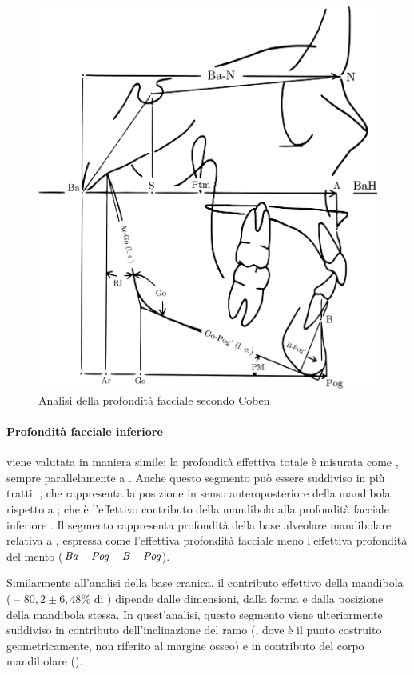 \begin{figure}[ht]
\centering
\includegraphics[width=.6\columnwidth]{./images/coben_profondita_facciale.pdf}
\caption{Analisi della profondità facciale secondo Coben}
\label{fig:coben_profondita_facciale}
\end{figure}

\paragraph{Profondità facciale inferiore} viene valutata in maniera simile: la profondità effettiva totale è misurata come , sempre parallelamente a . Anche questo segmento può essere suddiviso in più tratti: , che rappresenta la posizione in senso anteroposteriore della mandibola rispetto a ;  che è l'effettivo contributo della mandibola alla profondità facciale inferiore . Il segmento  rappresenta profondità della base alveolare mandibolare relativa a , espressa come l'effettiva profondità facciale meno l'effettiva profondità del mento ($\textit{Ba}-\textit{Pog} - \textit{B}-\textit{Pog}$).

Similarmente all'analisi della base cranica, il contributo effettivo della mandibola ( -- $80,2 \pm 6,48\%$ di ) dipende dalle dimensioni, dalla forma e dalla posizione della mandibola stessa. In quest'analisi, questo segmento viene ulteriormente suddiviso in contributo dell'in\-cli\-na\-zio\-ne del ramo (, dove  è il punto costruito geometricamente, non riferito al margine osseo) e in contributo del corpo mandibolare ().

